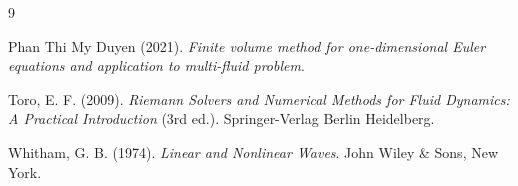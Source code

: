 \renewcommand{\bibname}{Tài liệu tham khảo}
\begin{thebibliography}{9}

Phan Thi My Duyen (2021). \textit{Finite volume method for one-dimensional Euler equations and application to multi-fluid problem}.

Toro, E. F. (2009). \textit{Riemann Solvers and Numerical Methods for Fluid Dynamics: A Practical Introduction} (3rd ed.). Springer-Verlag Berlin Heidelberg.

Whitham, G. B. (1974). \textit{Linear and Nonlinear Waves}. John Wiley \& Sons, New York.

\end{thebibliography}